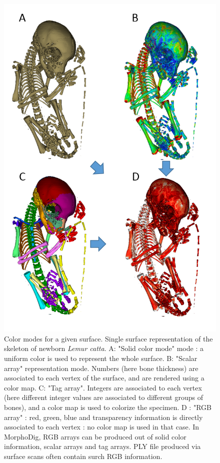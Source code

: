 \begin{figure}
  \centering
  \includegraphics[scale=0.6]{images/04/4color_modes.png} 
	\caption{Color modes for a given surface. Single surface representation of the skeleton of newborn \textit{Lemur catta}. A: "Solid color mode" mode : a uniform color is used to represent the whole surface. B: "Scalar array" representation mode. Numbers (here bone thickness) are associated to each vertex of the surface, and are rendered using a color map. C: "Tag array". Integers are associated to each vertex  (here different integer values are associated to different groups of bones), and a color map is used  to colorize the specimen. D : "RGB array" : red, green, blue and transparency information is directly associated to each vertex : no color map is used in that case. In MorphoDig, RGB arrays can be produced out of solid color information, scalar arrays and tag arrays. PLY file produced via surface scans often contain surch RGB information.}
\label{4color_modes}
 
\end{figure}